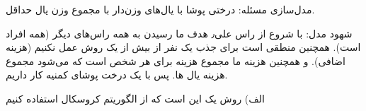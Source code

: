 مدل‌سازی مسئله:
درختی پوشا با یال‌های وزن‌دار با مجموع وزن یال حداقل.

شهود مدل:
با شروع از راس علی٫ هدف ما رسیدن به همه راس‌های دیگر (همه افراد است). همچنین منطقی است برای جذب یک نفر از بیش از یک روش عمل نکنیم (هزینه اضافی).
و همچنین هزینه ما مجموع هزینه برای هر  شخص است که می‌شود مجموع هزینه یال ها. پس با یک درخت پوشای کمنیه کار داریم.

الف)
روش یک این است که از الگوریتم کروسکال استفاده کنیم